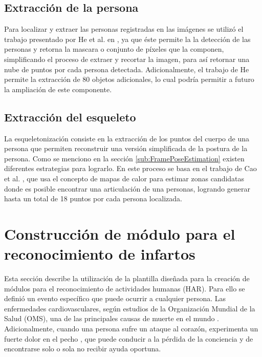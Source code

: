    \subsection{Extracción de la persona}
    \label{Sub:MakePerson}
         Para localizar y extraer las personas registradas en las imágenes se utilizó el trabajo presentado por He et al. en \cite{He2017}, ya que éste permite la la detección de las personas y retorna la mascara o conjunto de píxeles que la componen, simplificando el proceso de extraer y recortar la imagen, para así retornar una nube de puntos por cada persona detectada. Adicionalmente, el trabajo de He permite la extracción de 80 objetos adicionales, lo cual podría permitir a futuro la ampliación de este componente.
        
    \subsection{Extracción del esqueleto}
    \label{Sub:MakeSkeleton}
        La esqueletonización consiste en la extracción de los puntos del cuerpo de una persona que permiten reconstruir una versión simplificada de la postura de la persona. Como se menciono en la sección \ref{sub:FramePoseEstimation} existen diferentes estrategias para lograrlo. En este proceso se basa en el trabajo de Cao et al. \cite{Cao2017}, que usa el concepto de mapas de calor para estimar zonas candidatas donde es posible encontrar una articulación de una personas, logrando generar hasta un total de 18 puntos por cada persona localizada.
        
\section{Construcción de módulo para el reconocimiento de infartos}
\label{Sec:InfarctDetectModule}

    Esta sección describe la utilización de la plantilla diseñada para la creación de módulos para el reconocimiento de actividades humanas (HAR). Para ello se definió un evento específico que puede ocurrir a cualquier persona. Las enfermedades cardiovasculares, según estudios de la Organización Mundial de la Salud (OMS), una de las principales causas de muerte en el mundo \cite{OMS2018}. Adicionalmente, cuando una persona sufre un ataque al corazón, experimenta un fuerte dolor en el pecho \cite{Patel2018, Goff1998}, que puede conducir a la pérdida de la conciencia y de encontrarse solo o sola no recibir ayuda oportuna. 
    
